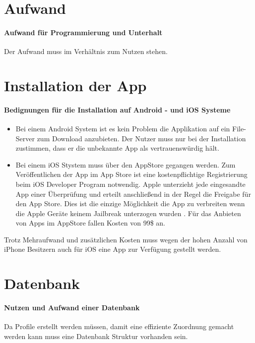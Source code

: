 \section{Aufwand}
\paragraph{Aufwand für Programmierung und Unterhalt} Der Aufwand muss im Verhältnis zum Nutzen stehen. 

\section{Installation der App}
\paragraph{Bedignungen für die Installation auf Android - und iOS Systeme}
\begin{itemize}
\item Bei einem Android System ist es kein Problem die Applikation auf ein File-Server zum Download anzubieten. Der Nutzer muss nur bei der Installation zustimmen, dass er die unbekannte App als vertrauenswürdig hält.
\item Bei einem iOS Stystem muss über den AppStore gegangen werden.  Zum Veröffentlichen der App im App Store ist eine kostenpflichtige Registrierung beim iOS Developer Program notwendig. Apple unterzieht jede eingesandte App einer Überprüfung und erteilt anschließend in der Regel die Freigabe für den App Store. Dies ist die einzige Möglichkeit die App zu verbreiten wenn die Apple Geräte keinem Jailbreak unterzogen wurden \cite{appStore}. Für das Anbieten von Apps im AppStore fallen Kosten von 99\$ an.
\end{itemize}
Trotz Mehraufwand und zusätzlichen Kosten muss wegen der hohen Anzahl von iPhone Besitzern auch für iOS eine App zur Verfügung gestellt werden.

\section{Datenbank}
\paragraph{Nutzen und Aufwand einer Datenbank}Da Profile erstellt werden müssen, damit eine effiziente Zuordnung gemacht werden kann muss eine Datenbank Struktur vorhanden sein.


